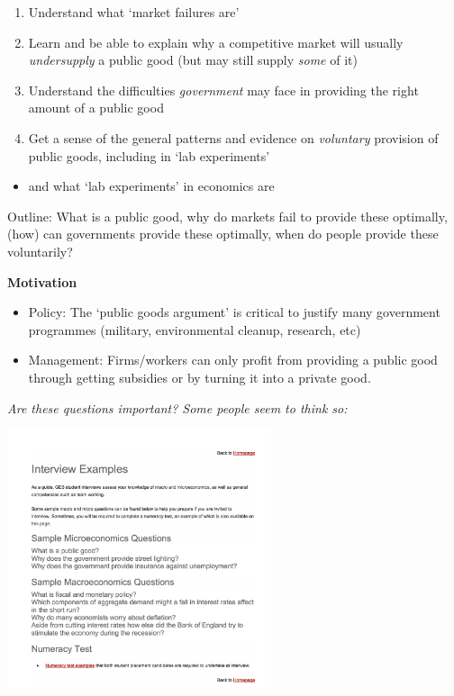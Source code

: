 \documentclass[]{article}
\providecommand{\tightlist}{%
  \setlength{\itemsep}{0pt}\setlength{\parskip}{0pt}}
\begin{document}
\begin{enumerate}
\def\labelenumi{\arabic{enumi}.}
\tightlist
\item
  Understand what `market failures are'
\item
  Learn and be able to explain why a competitive market will usually \emph{undersupply} a public good (but may still supply \emph{some} of it)
\item
  Understand the difficulties \emph{government} may face in providing the right amount of a public good
\item
  Get a sense of the general patterns and evidence on \emph{voluntary} provision of public goods, including in `lab experiments'
\end{enumerate}

\begin{itemize}
\tightlist
\item
  and what `lab experiments' in economics are
\end{itemize}

\bigskip

Outline: What is a public good, why do markets fail to provide these optimally, (how) can governments provide these optimally, when do people provide these voluntarily?

\bigskip

\textbf{Motivation}

\begin{itemize}
\tightlist
\item
  Policy: The `public goods argument' is critical to justify many government programmes (military, environmental cleanup, research, etc)
\item
  Management: Firms/workers can only profit from providing a public good through getting subsidies or by turning it into a private good.
\end{itemize}

\emph{Are these questions important? Some people seem to think so:}

\includegraphics[height=3in]{picsfigs/GES_sandwich_qns.png}
\end{document}
